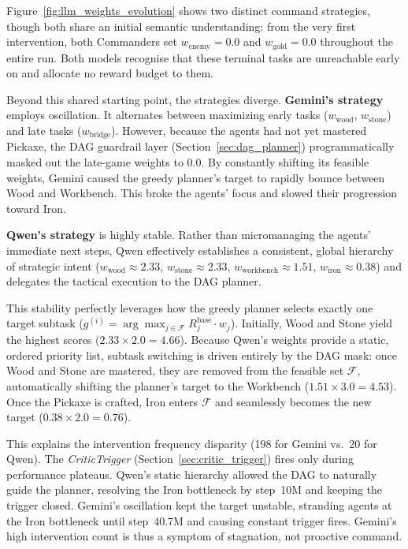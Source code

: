 Figure~\ref{fig:llm_weights_evolution} shows two distinct command strategies, though both share an initial semantic understanding: from the very first intervention, both Commanders set $w_{\text{enemy}} = 0.0$ and $w_{\text{gold}} = 0.0$ throughout the entire run. Both models recognise that these terminal tasks are unreachable early on and allocate no reward budget to them. 

Beyond this shared starting point, the strategies diverge. \textbf{Gemini's strategy} employs oscillation. It alternates between maximizing early tasks ($w_{\text{wood}}$, $w_{\text{stone}}$) and late tasks ($w_{\text{bridge}}$). However, because the agents had not yet mastered Pickaxe, the DAG guardrail layer (Section~\ref{sec:dag_planner}) programmatically masked out the late-game weights to $0.0$. By constantly shifting its feasible weights, Gemini caused the greedy planner's target to rapidly bounce between Wood and Workbench. This broke the agents' focus and slowed their progression toward Iron.

\textbf{Qwen's strategy} is highly stable. Rather than micromanaging the agents' immediate next steps, Qwen effectively establishes a consistent, global hierarchy of strategic intent ($w_{\text{wood}} \approx 2.33$, $w_{\text{stone}} \approx 2.33$, $w_{\text{workbench}} \approx 1.51$, $w_{\text{iron}} \approx 0.38$) and delegates the tactical execution to the DAG planner. 

This stability perfectly leverages how the greedy planner selects exactly one target subtask ($g^{(i)} = \arg\max_{j \in \mathcal{F}} R_j^{\text{base}} \cdot w_j$). Initially, Wood and Stone yield the highest scores ($2.33 \times 2.0 = 4.66$). Because Qwen's weights provide a static, ordered priority list, subtask switching is driven entirely by the DAG mask: once Wood and Stone are mastered, they are removed from the feasible set $\mathcal{F}$, automatically shifting the planner's target to the Workbench ($1.51 \times 3.0 = 4.53$). Once the Pickaxe is crafted, Iron enters $\mathcal{F}$ and seamlessly becomes the new target ($0.38 \times 2.0 = 0.76$). 

This explains the intervention frequency disparity (198 for Gemini vs.\ 20 for Qwen). The \emph{CriticTrigger} (Section~\ref{sec:critic_trigger}) fires only during performance plateaus. Qwen's static hierarchy allowed the DAG to naturally guide the planner, resolving the Iron bottleneck by step~10M and keeping the trigger closed. Gemini's oscillation kept the target unstable, stranding agents at the Iron bottleneck until step~40.7M and causing constant trigger fires. Gemini's high intervention count is thus a symptom of stagnation, not proactive command.

